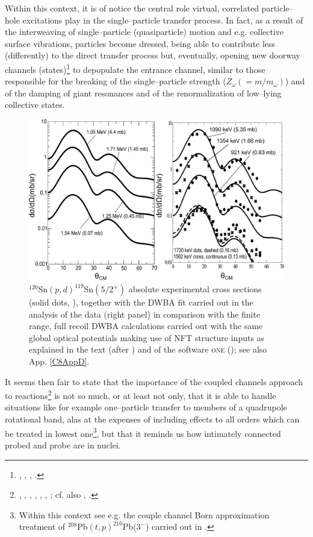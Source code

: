    Within this context, it is of notice  the central role virtual, correlated particle--hole excitations play in the single--particle transfer process. In fact, as a result of the interweaving of single--particle (quasiparticle) motion and e.g. collective surface vibrations, particles become dressed, being able to contribute less (differently) to the direct transfer process but, eventually, opening new doorway channels (states)\footnote{\cite{Feshbach:58}, \cite{Rawitscher:87}, \cite{Bortignon:81}, \cite{Bertsch:83}.} to depopulate the entrance channel, similar to those responsible for the breaking of the single--particle strength ($Z_\omega(=m/m_\omega)$) and of the damping of giant resonances and of the renormalization of low--lying collective 	states.
    \begin{figure}
    \centerline{\includegraphics*[width=\textwidth,angle=0]{C6/figs_C6/cross_teor_exp.pdf}}
    \caption{$^{120}$Sn$(p,d)^{119}$Sn$(5/2^+)$ absolute experimental cross sections (solid dots, \cite{Dickey:82}), together with the DWBA fit carried out in the analysis of the data (right panel) in comparison with the finite range, full recoil DWBA calculations carried out with the same global optical potentials  making use of NFT structure inputs as explained in the text (after \cite{Idini:15}) and of the software \textsc{one} (\cite{Potel:12b}); see also App. \ref{C8AppD}.}\label{fig6.2.3}
    \end{figure}
  
  It seems then fair to state that the importance of the coupled channels approach to reactions\footnote{ \cite{Thompson:88}, \cite{Thompson:13}, \cite{Tamura:70}, \cite{Ascuitto:69}, \cite{Ascuitto:70}, \cite{Ascuitto:71}, \cite{Ascuitto:72}; cf. also \cite{Fernandez:10}, \cite{Fernandez:10b}.} is not so much, or at least not only, that it is able to handle situations like for example one--particle transfer to members of a quadrupole rotational band, alas at the expenses of including effects to all orders which can be treated in lowest one\footnote{Within this context see e.g. the couple channel Born approximation treatment of $^{208}$Pb$(t,p)^{210}$Pb($3^-$) carried out in \cite{Flynn:72b}.}, but that it reminds us how intimately connected  probed and probe are in nuclei.
  
